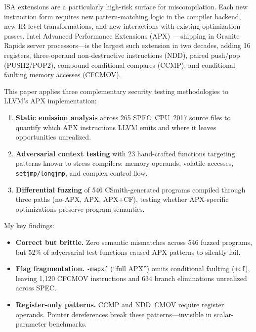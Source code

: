 \documentclass[acmsmall,nonacm]{acmart}
\begin{document}
ISA extensions are a particularly high-risk surface for
miscompilation. Each new instruction form requires new pattern-matching
logic in the compiler backend, new IR-level transformations, and new
interactions with existing optimization passes. Intel Advanced
Performance Extensions
(APX)~\cite{intel2024apx}---shipping in Granite Rapids server
processors---is the largest such extension in two decades, adding
16 registers, three-operand non-destructive instructions (NDD), paired
push/pop (PUSH2/POP2), compound conditional compares (CCMP), and
conditional faulting memory accesses (CFCMOV).

This paper applies three complementary security testing methodologies
to LLVM's APX implementation:

\begin{enumerate}
\item \textbf{Static emission analysis} across 265 SPEC~CPU~2017
  source files to quantify which APX instructions LLVM emits and
  where it leaves opportunities unrealized.

\item \textbf{Adversarial context testing} with 23 hand-crafted
  functions targeting patterns known to stress compilers: memory
  operands, volatile accesses, \texttt{setjmp/longjmp}, and complex
  control flow.

\item \textbf{Differential fuzzing} of 546 CSmith-generated programs
  compiled through three paths (no-APX, APX, APX+CF), testing whether
  APX-specific optimizations preserve program semantics.
\end{enumerate}

\noindent My key findings:

\begin{itemize}
\item \textbf{Correct but brittle.} Zero semantic mismatches across
  546 fuzzed programs, but 52\% of adversarial test functions caused
  APX patterns to silently fail.

\item \textbf{Flag fragmentation.} \texttt{-mapxf} (``full APX'')
  omits conditional faulting (\texttt{+cf}), leaving 1,120 CFCMOV
  instructions and 634 branch eliminations unrealized across SPEC.

\item \textbf{Register-only patterns.} CCMP and NDD~CMOV require
  register operands. Pointer dereferences break these
  patterns---invisible in scalar-parameter benchmarks.
\end{itemize}
\end{document}
